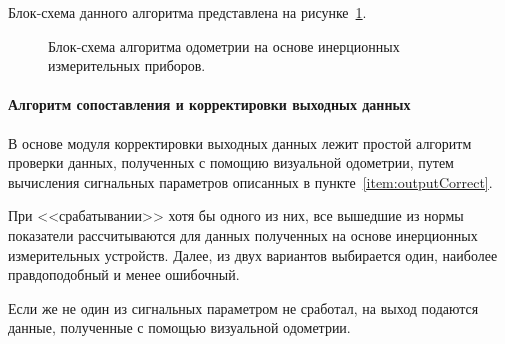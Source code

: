 Блок-схема данного алгоритма представлена на рисунке~\ref{pic:IMUAlgo}.
\begin{figure}[H]
\caption{Блок-схема алгоритма одометрии на основе инерционных измерительных приборов.}
\label{pic:IMUAlgo}
\end{figure}


\paragraph{Алгоритм сопоставления и корректировки выходных данных}
В основе модуля корректировки выходных данных лежит простой алгоритм проверки данных, полученных с помощию визуальной одометрии, путем вычисления сигнальных параметров описанных в пункте~\ref{item:outputCorrect}. 

При <<срабатывании>> хотя бы одного из них, все вышедшие из нормы показатели рассчитываются для данных полученных на основе инерционных измерительных устройств. Далее, из двух вариантов выбирается один, наиболее правдоподобный и менее ошибочный. 

Если же не один из сигнальных параметром не сработал, на выход подаются данные, полученные с помощью визуальной одометрии. 

